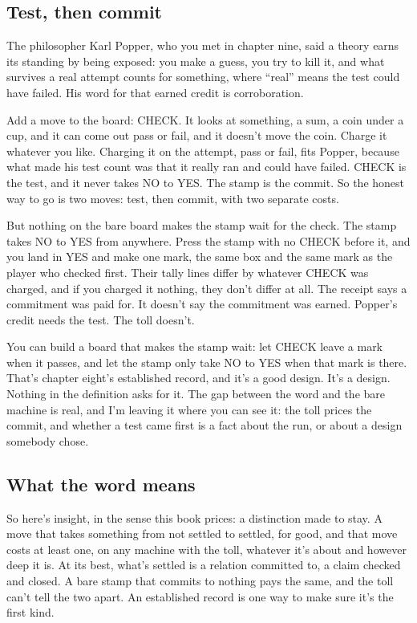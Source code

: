 \documentclass[11pt,twoside]{article}
\theoremstyle{thielethm}
\theoremstyle{thieledef}
\theoremstyle{thieledef}
\theoremstyle{thieledef}
\theoremstyle{thielethm}
\theoremstyle{thieleobs}
\theoremstyle{thielethm}
\begin{document}
\subsection{Test, then commit}

The philosopher Karl Popper, who you met in chapter nine, said a theory earns its standing by being exposed: you make a guess, you try to kill it, and what survives a real attempt counts for something, where ``real'' means the test could have failed. His word for that earned credit is corroboration.

Add a move to the board: CHECK. It looks at something, a sum, a coin under a cup, and it can come out pass or fail, and it doesn't move the coin. Charge it whatever you like. Charging it on the attempt, pass or fail, fits Popper, because what made his test count was that it really ran and could have failed. CHECK is the test, and it never takes NO to YES. The stamp is the commit. So the honest way to go is two moves: test, then commit, with two separate costs.

But nothing on the bare board makes the stamp wait for the check. The stamp takes NO to YES from anywhere. Press the stamp with no CHECK before it, and you land in YES and make one mark, the same box and the same mark as the player who checked first. Their tally lines differ by whatever CHECK was charged, and if you charged it nothing, they don't differ at all. The receipt says a commitment was paid for. It doesn't say the commitment was earned. Popper's credit needs the test. The toll doesn't.

You can build a board that makes the stamp wait: let CHECK leave a mark when it passes, and let the stamp only take NO to YES when that mark is there. That's chapter eight's established record, and it's a good design. It's a design. Nothing in the definition asks for it. The gap between the word and the bare machine is real, and I'm leaving it where you can see it: the toll prices the commit, and whether a test came first is a fact about the run, or about a design somebody chose.

\subsection{What the word means}

So here's insight, in the sense this book prices: a distinction made to stay. A move that takes something from not settled to settled, for good, and that move costs at least one, on any machine with the toll, whatever it's about and however deep it is. At its best, what's settled is a relation committed to, a claim checked and closed. A bare stamp that commits to nothing pays the same, and the toll can't tell the two apart. An established record is one way to make sure it's the first kind.
\end{document}
